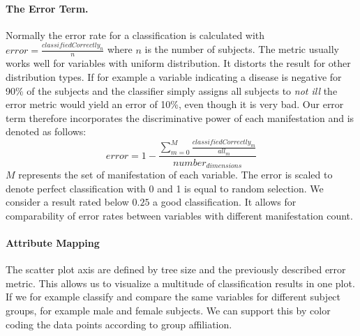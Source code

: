 \documentclass[a4paper,twoside]{style/article}
\begin{document}
\paragraph{The Error Term. }
Normally the error rate for a classification is calculated with $error = \frac{classifiedCorrectly_{n}} {n}$ where $n$ is the number of subjects.
The metric usually works well for variables with uniform distribution.
It distorts the result for other distribution types.
If for example a variable indicating a disease is negative for 90\% of the subjects and the classifier simply assigns all subjects to \emph{not ill} the error metric would yield an error of 10\%, even though it is very bad.
Our error term therefore incorporates the discriminative power of each manifestation and is denoted as follows:
\begin{equation}
error = 1 - \frac{\sum_{m=0}^M \frac{classifiedCorrectly_{m}}{all_{m}}}{number_{dimensions}}
\end{equation}
$M$ represents the set of manifestation of each variable.
The error is scaled to denote perfect classification with 0 and 1 is equal to random selection.
We consider a result rated below $0.25$ a good classification.
It allows for comparability of error rates between variables with different manifestation count.

\paragraph{Attribute Mapping}
The scatter plot axis are defined by tree size and the previously described error metric.
This allows us to visualize a multitude of classification results in one plot.
If we for example classify and compare the same variables for different subject groups, for example male and female subjects.
We can support this by color coding the data points according to group affiliation.
\end{document}
